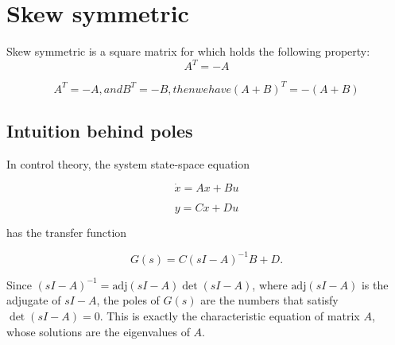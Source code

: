 \section{Skew symmetric}

Skew symmetric is a square matrix for which holds the following property:
\[A^T = -A\]

\[A^T = -A, and B^T= -B, then we have (A + B)^T = -(A + B)\]



\subsection{Intuition behind poles}
In control theory, the system state-space equation

\[\dot{x} = Ax+Bu\]

\[y=Cx+Du\]

has the transfer function

\[G(s)=C(sI-A)^{-1}B+D.\]

Since \((sI-A)^{-1}=\text{adj}(sI-A)\det(sI-A)\), where \(\text{adj}(sI-A)\) is the adjugate of \(sI-A\), the poles of \(G(s)\) are the numbers that satisfy \(\det(sI-A)=0\). This is exactly the characteristic equation of matrix \(A\), whose solutions are the eigenvalues of \(A\).
